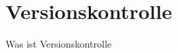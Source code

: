 \section{Versionskontrolle}

\begin{frame}
  \tableofcontents[currentsection]
\end{frame}

\begin{frame}{Was ist Versionskontrolle}
\end{frame}

